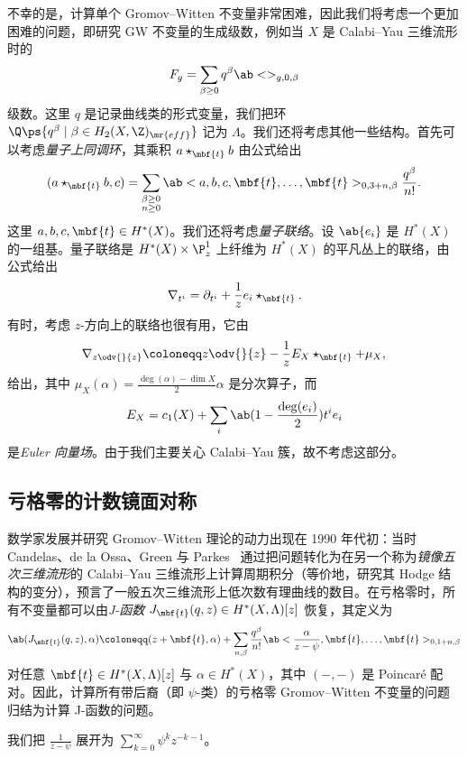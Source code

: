 不幸的是，计算单个 Gromov--Witten 不变量非常困难，因此我们将考虑一个更加困难的问题，即研究 GW 不变量的生成级数，例如当 \(X\) 是 Calabi--Yau 三维流形时的
\[ F_g = \sum_{\beta \geq 0} q^{\beta} \ab<>_{g,0,\beta} \]
级数。这里 \(q\) 是记录曲线类的形式变量，我们把环 \(\Q\ps{q^{\beta} \mid \beta \in H_2(X, \Z)_{\mr{eff}}}\) 记为 \(\Lambda\)。我们还将考虑其他一些结构。首先可以考虑\textit{量子上同调环}，其乘积 \(a \star_{\mbf{t}} b\) 由公式给出
\[
    (a \star_{\mbf{t}} b, c) = \sum_{\substack{\beta \geq 0 \\ n \geq 0}} \ab<a,b,c, \mbf{t}, \ldots, \mbf{t}>_{0,3+n,\beta} \frac{q^{\beta}}{n!}.
\]
这里 \(a,b,c, \mbf{t} \in H^*(X)\)。我们还将考虑\textit{量子联络}。设 \(\ab\{ e_i \}\) 是 \(H^*(X)\) 的一组基。量子联络是 \(H^*(X) \times \P^1_z\) 上纤维为 \(H^*(X)\) 的平凡丛上的联络，由公式给出
\[ \nabla_{t^i} = \partial_{t^i} + \frac{1}{z} e_i \star_{\mbf{t}}. \]
有时，考虑 \(z\)-方向上的联络也很有用，它由
\[ \nabla_{z \odv{}{z}} \coloneqq z \odv{}{z} - \frac{1}{z} E_X \star_{\mbf{t}} + \mu_X, \]
给出，其中 \(\mu_X(\alpha) = \frac{\deg(\alpha) - \dim X}{2} \alpha\) 是分次算子，而
\[ E_X = c_1(X) + \sum_i \ab(1 - \frac{\deg(e_i)}{2})t^i e_i \]
是\textit{Euler 向量场}。由于我们主要关心 Calabi--Yau 簇，故不考虑这部分。

\subsection{亏格零的计数镜面对称}%
\label{sub:Enumerative mirror symmetry in genus zero}

数学家发展并研究 Gromov--Witten 理论的动力出现在 1990 年代初：当时 Candelas、de la Ossa、Green 与 Parkes~\cite{CandelasEtAl1991} 通过把问题转化为在另一个称为\textit{镜像五次三维流形}的 Calabi--Yau 三维流形上计算周期积分（等价地，研究其 Hodge 结构的变分），预言了一般五次三维流形上低次数有理曲线的数目。在亏格零时，所有不变量都可以由\textit{J-函数} \(J_{\mbf{t}}(q,z) \in H^*(X, \Lambda)[z]\) 恢复，其定义为
\[ \ab( J_{\mbf{t}}(q, z), \alpha ) \coloneqq (z + \mbf{t}, \alpha) + \sum_{n, \beta} \frac{q^{\beta}}{n!} \ab< \frac{\alpha}{z-\psi}, \mbf{t}, \ldots, \mbf{t}>_{0,1+n, \beta} \]
对任意 \(\mbf{t} \in H^*(X, \Lambda)[z]\) 与 \(\alpha \in H^*(X)\)，其中 \((-,-)\) 是 Poincar\'e 配对。因此，计算所有带后裔（即 \(\psi\)-类）的亏格零 Gromov--Witten 不变量的问题归结为计算 J-函数的问题。

\begin{rmk}
    我们把 \(\frac{1}{z-\psi}\) 展开为 \(\sum_{k=0}^{\infty} \psi^k z^{-k-1}\)。
\end{rmk}

